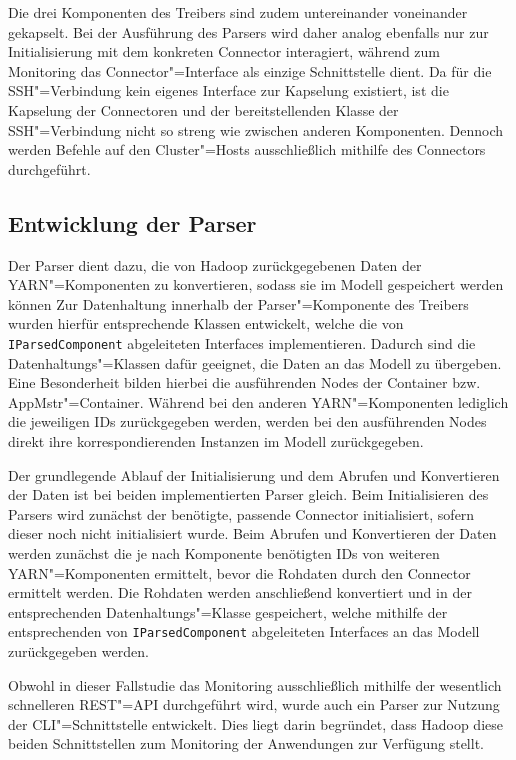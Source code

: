Die drei Komponenten des Treibers sind zudem untereinander  voneinander gekapselt.
Bei der Ausführung des Parsers wird daher analog ebenfalls nur zur Initialisierung mit dem konkreten Connector interagiert, während zum Monitoring das Connector"=Interface als einzige Schnittstelle dient.
Da für die SSH"=Verbindung kein eigenes Interface zur Kapselung existiert, ist die Kapselung der Connectoren und der bereitstellenden Klasse der SSH"=Verbindung nicht so streng wie zwischen anderen Komponenten.
Dennoch werden Befehle auf den Cluster"=Hosts ausschließlich mithilfe des Connectors durchgeführt.

\subsection{Entwicklung der Parser}
\label{subsec:implementedParsers}

Der Parser dient dazu, die von Hadoop zurückgegebenen Daten der YARN"=Komponenten zu konvertieren, sodass sie im Modell gespeichert werden können
Zur Datenhaltung innerhalb der Parser"=Komponente des Treibers wurden hierfür entsprechende Klassen entwickelt, welche die von \texttt{IParsedComponent} abgeleiteten Interfaces implementieren.
Dadurch sind die Datenhaltungs"=Klassen dafür geeignet, die Daten an das Modell zu übergeben.
Eine Besonderheit bilden hierbei die ausführenden Nodes der Container bzw. \gls{AppMstr}"=Container.
Während bei den anderen YARN"=Komponenten lediglich die jeweiligen IDs zurückgegeben werden, werden bei den ausführenden Nodes direkt ihre korrespondierenden Instanzen im Modell zurückgegeben.

Der grundlegende Ablauf der Initialisierung und dem Abrufen und Konvertieren der Daten ist bei beiden implementierten Parser gleich.
Beim Initialisieren des Parsers wird zunächst der benötigte, passende Connector initialisiert, sofern dieser noch nicht initialisiert wurde.
Beim Abrufen und Konvertieren der Daten werden zunächst die je nach Komponente benötigten IDs von weiteren YARN"=Komponenten ermittelt, bevor die Rohdaten durch den Connector ermittelt werden.
Die Rohdaten werden anschließend konvertiert und in der entsprechenden Datenhaltungs"=Klasse gespeichert, welche mithilfe der entsprechenden von \texttt{IParsedComponent} abgeleiteten Interfaces an das Modell zurückgegeben werden.

Obwohl in dieser Fallstudie das Monitoring ausschließlich mithilfe der wesentlich schnelleren REST"=API durchgeführt wird, wurde auch ein Parser zur Nutzung der \gls{CLI}"=Schnittstelle entwickelt.
Dies liegt darin begründet, dass Hadoop diese beiden Schnittstellen zum Monitoring der Anwendungen zur Verfügung stellt.

